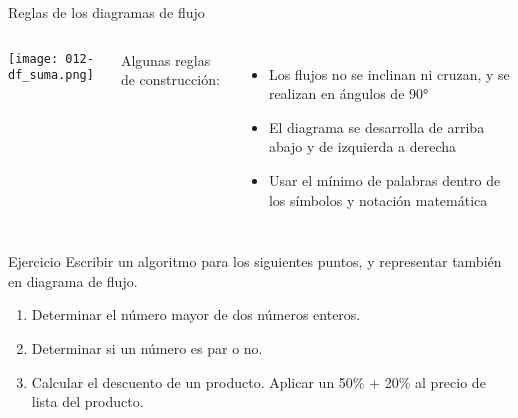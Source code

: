 \begin{frame}[c]{Reglas de los diagramas de flujo}
  \begin{columns}
      \begin{center}
        \texttt{[image: 012-df\_suma.png]}
      \end{center}
      Algunas reglas de construcción:
      \begin{itemize}
        \item Los flujos no se inclinan ni cruzan, y se realizan en ángulos de 90°
        \pausa
        \item El diagrama se desarrolla de arriba abajo y de izquierda a derecha
        \pausa
        \item Usar el mínimo de palabras dentro de los símbolos y notación matemática
      \end{itemize}
  \end{columns}
\end{frame}



\begin{frame}[c]{Ejercicio}
  Escribir un algoritmo para los siguientes puntos, y representar también en
  diagrama de flujo.
  \begin{enumerate}
    \item Determinar el número mayor de dos números enteros.
    \item Determinar si un número es par o no.
    \item Calcular el descuento de un producto. Aplicar un 50\% + 20\% al
      precio de lista del producto.
  \end{enumerate}
\end{frame}
